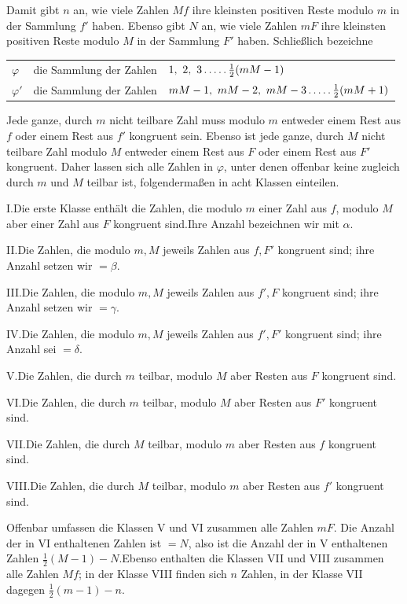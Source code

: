 Damit gibt $n$ an, wie viele Zahlen $Mf$ ihre kleinsten positiven Reste modulo $m$ in der Sammlung $f'$ haben. Ebenso gibt $N$ an, wie viele Zahlen $mF$ ihre kleinsten positiven Reste modulo $M$ in der Sammlung $F'$ haben. Schließlich bezeichne

{\small
\begin{center}\setlength{\tabcolsep}{3pt}
\begin{tabular}{@{}lll@{}}
$\varphi$ & die Sammlung der Zahlen & $1,\ 2,\ 3\dotsfive\frac12(mM-1)$ \\
$\varphi'$ & die Sammlung der Zahlen & $mM-1,\ mM-2,\ mM-3\dotsfive\frac12(mM+1)$
\end{tabular}\end{center}
}

Jede ganze, durch $m$ nicht teilbare Zahl muss modulo $m$ entweder einem Rest aus $f$ oder einem Rest aus $f'$ kongruent sein. Ebenso ist jede ganze, durch $M$ nicht teilbare Zahl modulo $M$ entweder einem Rest aus $F$ oder einem Rest aus $F'$ kongruent. Daher lassen sich alle Zahlen in $\varphi$, unter denen offenbar keine zugleich durch $m$ und $M$ teilbar ist, folgendermaßen in acht Klassen einteilen.

I.\quad Die erste Klasse enthält die Zahlen, die modulo $m$ einer Zahl aus $f$, modulo $M$ aber einer Zahl aus $F$ kongruent sind.\quad Ihre Anzahl bezeichnen wir mit $\alpha$.

II.\quad Die Zahlen, die modulo $m,M$ jeweils Zahlen aus $f,F'$ kongruent sind; ihre Anzahl setzen wir $=\beta$.

III.\quad Die Zahlen, die modulo $m,M$ jeweils Zahlen aus $f',F$ kongruent sind; ihre Anzahl setzen wir $=\gamma$.

IV.\quad Die Zahlen, die modulo $m,M$ jeweils Zahlen aus $f',F'$ kongruent sind; ihre Anzahl sei $=\delta$.

V.\quad Die Zahlen, die durch $m$ teilbar, modulo $M$ aber Resten aus $F$ kongruent sind.

VI.\quad Die Zahlen, die durch $m$ teilbar, modulo $M$ aber Resten aus $F'$ kongruent sind.

VII.\quad Die Zahlen, die durch $M$ teilbar, modulo $m$ aber Resten aus $f$ kongruent sind.

VIII.\quad Die Zahlen, die durch $M$ teilbar, modulo $m$ aber Resten aus $f'$ kongruent sind.

Offenbar umfassen die Klassen V und VI zusammen alle Zahlen $mF$. Die Anzahl der in VI enthaltenen Zahlen ist $=N$, also ist die Anzahl der in V enthaltenen Zahlen $\frac12(M-1)-N$.\quad Ebenso enthalten die Klassen VII und VIII zusammen alle Zahlen $Mf$; in der Klasse VIII finden sich $n$ Zahlen, in der Klasse VII dagegen $\frac12(m-1)-n$.

